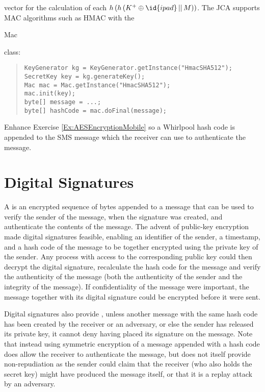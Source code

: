 vector for the calculation of each $h\left(h\left(K^+\oplus\id{ipad} \,||\, M\right)\right)$.
The JCA supports MAC algorithms such as HMAC with the \begin{code}Mac\end{code} class:
\begin{quote}\begin{code}\begin{verbatim}
KeyGenerator kg = KeyGenerator.getInstance("HmacSHA512");
SecretKey key = kg.generateKey();
Mac mac = Mac.getInstance("HmacSHA512");
mac.init(key);
byte[] message = ...;
byte[] hashCode = mac.doFinal(message);
\end{verbatim}\end{code}\end{quote}


\begin{exercise}
  Enhance Exercise \ref{Ex:AESEncryptionMobile} so a Whirlpool hash code is appended
  to the SMS message which the receiver can use to authenticate the message.
\end{exercise}



\section{Digital Signatures}\label{Se:DigitalSignatures}
A  is an encrypted sequence of bytes appended to a message
that can be used to verify the sender of the message, when the signature was created,
and authenticate the contents of the message.
The advent of public-key encryption made digital signatures feasible, enabling
an identifier of the sender, a timestamp, and a hash code of the message to be together
encrypted using the private key of the sender.
Any process with access to the corresponding public key could then decrypt the digital
signature, recalculate the hash code for the message and verify the authenticity
of the message (both the authenticity of the sender and the integrity of the message).
If confidentiality of the message were important, the message together with its
digital signature could be encrypted before it were sent.

Digital signatures also provide , unless another message
with the same hash code has been created by the receiver or an adversary,
or else the sender has released its private key,
it cannot deny having placed its signature on the message.
Note that instead using symmetric encryption of a message appended with a hash code does
allow the receiver to authenticate the message, but does not itself
provide non-repudiation as the sender could claim that the receiver (who also
holds the secret key) might have produced the message itself, or that it is a
replay attack by an adversary.

